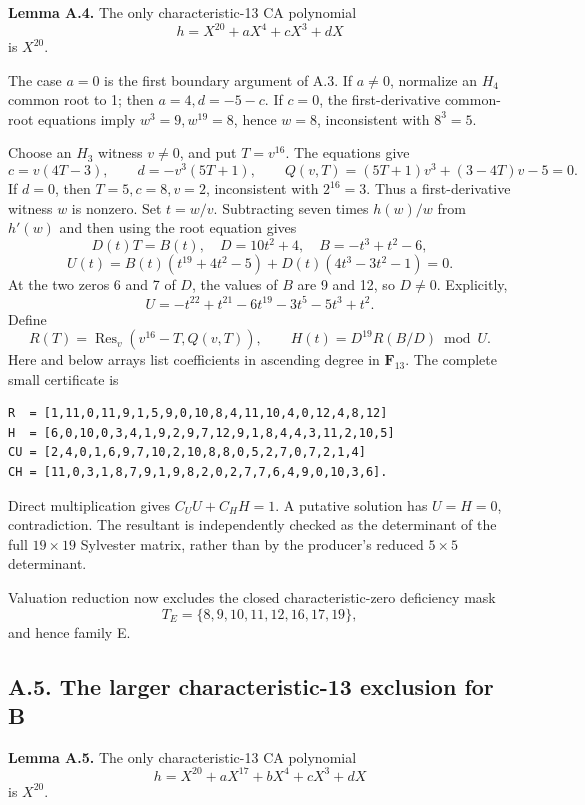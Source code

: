 \documentclass[
  british,
  10pt,
  a4paper,
]{article}
\begin{document}
\textbf{Lemma A.4.} The only characteristic-13 CA polynomial \[
h=X^{20}+aX^4+cX^3+dX
\] is \(X^{20}\).

The case \(a=0\) is the first boundary argument of A.3. If \(a\ne0\),
normalize an \(H_4\) common root to 1; then \(a=4,d=-5-c\). If \(c=0\),
the first-derivative common-root equations imply \(w^3=9,w^{19}=8\),
hence \(w=8\), inconsistent with \(8^3=5\).

Choose an \(H_3\) witness \(v\ne0\), and put \(T=v^{16}\). The equations
give \[
c=v(4T-3),\qquad d=-v^3(5T+1),\qquad
Q(v,T)=(5T+1)v^3+(3-4T)v-5=0.
\] If \(d=0\), then \(T=5,c=8,v=2\), inconsistent with \(2^{16}=3\).
Thus a first-derivative witness \(w\) is nonzero. Set \(t=w/v\).
Subtracting seven times \(h(w)/w\) from \(h'(w)\) and then using the
root equation gives \[
D(t)T=B(t),\quad D=10t^2+4,\quad B=-t^3+t^2-6,
\] \[
U(t)=B(t)(t^{19}+4t^2-5)+D(t)(4t^3-3t^2-1)=0.
\] At the two zeros 6 and 7 of \(D\), the values of \(B\) are 9 and 12,
so \(D\ne0\). Explicitly, \[
U=-t^{22}+t^{21}-6t^{19}-3t^5-5t^3+t^2.
\] Define \[
R(T)=\operatorname{Res}_v(v^{16}-T,Q(v,T)),\qquad
H(t)=D^{19}R(B/D)\bmod U.
\] Here and below arrays list coefficients in ascending degree in
\(\mathbf F_{13}\). The complete small certificate is

\begin{verbatim}
R  = [1,11,0,11,9,1,5,9,0,10,8,4,11,10,4,0,12,4,8,12]
H  = [6,0,10,0,3,4,1,9,2,9,7,12,9,1,8,4,4,3,11,2,10,5]
CU = [2,4,0,1,6,9,7,10,2,10,8,8,0,5,2,7,0,7,2,1,4]
CH = [11,0,3,1,8,7,9,1,9,8,2,0,2,7,7,6,4,9,0,10,3,6].
\end{verbatim}

Direct multiplication gives \(C_UU+C_HH=1\). A putative solution has
\(U=H=0\), contradiction. The resultant is independently checked as the
determinant of the full \(19\times19\) Sylvester matrix, rather than by
the producer's reduced \(5\times5\) determinant.

Valuation reduction now excludes the closed characteristic-zero
deficiency mask \[
T_E=\{8,9,10,11,12,16,17,19\},
\] and hence family E.

\subsection*{A.5. The larger characteristic-13 exclusion for
B}\label{a.5.-the-larger-characteristic-13-exclusion-for-b}

\textbf{Lemma A.5.} The only characteristic-13 CA polynomial \[
h=X^{20}+aX^{17}+bX^4+cX^3+dX
\tag{S8}
\] is \(X^{20}\).
\end{document}
